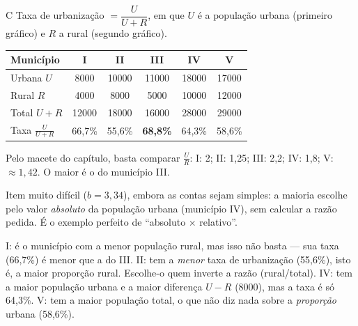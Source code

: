 \begin{resolucao}{C}
 Taxa de urbanização $=\dfrac{U}{U+R}$, em que $U$ é a população urbana (primeiro gráfico) e $R$ a rural (segundo gráfico).

\begin{center}\small
\begin{tabular}{lccccc}
\toprule
Município & I & II & III & IV & V\\
\midrule
Urbana $U$ & \num{8000} & \num{10000} & \num{11000} & \num{18000} & \num{17000}\\
Rural $R$ & \num{4000} & \num{8000} & \num{5000} & \num{10000} & \num{12000}\\
Total $U+R$ & \num{12000} & \num{18000} & \num{16000} & \num{28000} & \num{29000}\\
Taxa $\frac{U}{U+R}$ & 66,7\% & 55,6\% & \textbf{68,8\%} & 64,3\% & 58,6\%\\
\bottomrule
\end{tabular}
\end{center}

 Pelo macete do capítulo, basta comparar $\frac{U}{R}$: I: 2; II: 1,25; III: 2,2; IV: 1,8; V: $\approx1{,}42$. O maior é o do município III.


Item muito difícil ($b=3{,}34$), embora as contas sejam simples: a maioria escolhe pelo valor \emph{absoluto} da população urbana (município IV), sem calcular a razão pedida. É o exemplo perfeito de “absoluto × relativo”.
\begin{distratores}
 I: é o município com a menor população rural, mas isso não basta — sua taxa (66,7\%) é menor que a do III.
 II: tem a \emph{menor} taxa de urbanização (55,6\%), isto é, a maior proporção rural. Escolhe-o quem inverte a razão (rural/total).
 IV: tem a maior população urbana e a maior diferença $U-R$ (\num{8000}), mas a taxa é só 64,3\%.
 V: tem a maior população total, o que não diz nada sobre a \emph{proporção} urbana (58,6\%).
\end{distratores}
\end{resolucao}

\secaoineditas

